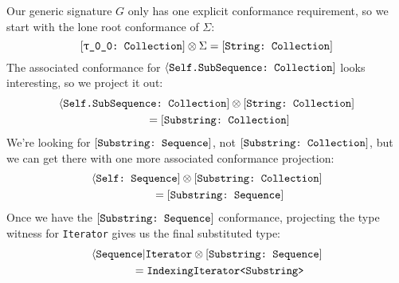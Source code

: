 \documentclass[../generics]{subfiles}
\begin{document}
\begin{example}
Our generic signature $G$ only has one explicit conformance requirement, so we start with the lone root conformance of $\Sigma$:
\[
\rTCollection \otimes \Sigma = \StringCollection
\]
The associated conformance for $\langle\texttt{Self.SubSequence:~Collection}]$ looks interesting, so we project it out:
\begin{gather*}
\langle\texttt{Self.SubSequence:~Collection}] \otimes [\texttt{String:~Collection}]\\
\qquad {} = [\texttt{Substring:~Collection}]
\end{gather*}
We're looking for $[\texttt{Substring:~Sequence}]$, not $[\texttt{Substring:~Collection}]$, but we can get there with one more associated conformance projection:
\begin{gather*}
\langle\texttt{Self:~Sequence}] \otimes [\texttt{Substring:~Collection}]\\
\qquad {} = [\texttt{Substring:~Sequence}]
\end{gather*}
Once we have the $[\texttt{Substring:~Sequence}]$ conformance, projecting the type witness for \verb|Iterator| gives us the final substituted type:
\begin{gather*}
\langle\texttt{Sequence}|\texttt{Iterator}\otimes [\texttt{Substring:~Sequence}]\\
\qquad {} = \texttt{IndexingIterator<Substring>}
\end{gather*}


\end{example}
\end{document}
